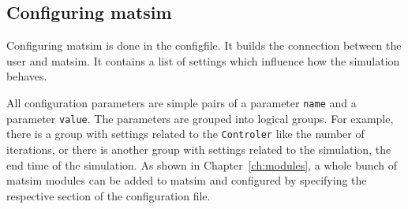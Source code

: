 \subsection{Configuring \protect\gls{matsim}}
\label{sec:lgs-config}
Configuring \gls{matsim} is 
done in the \gls{configfile}. It builds the connection between the user and \gls{matsim}. It contains a list of settings which influence how the simulation behaves.
%
%

All configuration parameters are simple pairs of a \gls{parameter} \lstinline|name| and a \gls{parameter} \lstinline|value|. The \glspl{parameter} are grouped into logical groups. For example, there is a group with settings related to the \lstinline|Controler| like the number of \glspl{iteration}, or there is another group with settings related to the \gls{simulation}, \eg the end time of the simulation. As shown in Chapter~\ref{ch:modules}, a whole bunch of \gls{matsim} modules can be added to \gls{matsim} and configured by specifying the respective section of the configuration file.

